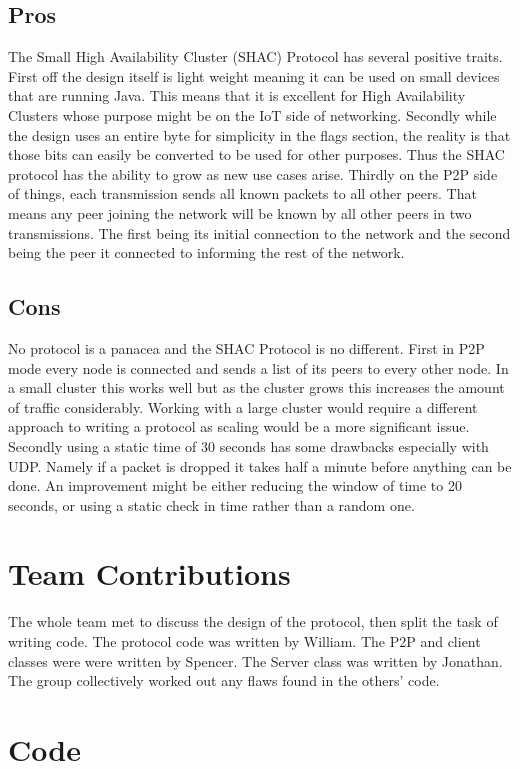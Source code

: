 \documentclass[11pt]{article}
\begin{document}
\begin{doublespace}
\subsection{Pros}
The Small High Availability Cluster (SHAC) Protocol has several positive traits. First off the design itself is light weight meaning it can be used on small devices that are running Java. This means that it is excellent for High Availability Clusters whose purpose might be on the IoT side of networking. Secondly while the design uses an entire byte for simplicity in the flags section, the reality is that those bits can easily be converted to be used for other purposes. Thus the SHAC protocol has the ability to grow as new use cases arise. Thirdly on the P2P side of things, each transmission sends all known packets to all other peers. That means any peer joining the network will be known by all other peers in two transmissions. The first being its initial connection to the network and the second being the peer it connected to informing the rest of the network.

\subsection{Cons} 
No protocol is a panacea and the SHAC Protocol is no different. First in P2P mode every node is connected and sends a list of its peers to every other node. In a small cluster this works well but as the cluster grows this increases the amount of traffic considerably. Working with a large cluster would require a different approach to writing a protocol as scaling would be a more significant issue. Secondly using a static time of 30 seconds has some drawbacks especially with UDP. Namely if a packet is dropped it takes half a minute before anything can be done. An improvement might be either reducing the window of time to 20 seconds, or using a static check in time rather than a random one. 

\section{Team Contributions}

The whole team met to discuss the design of the protocol, then split the task of writing code.
The protocol code was written by William.
The P2P and client classes were were written by Spencer.
The Server class was written by Jonathan.
The group collectively worked out any flaws found in the others' code.

\section{Code}
\end{doublespace}
\end{document}
